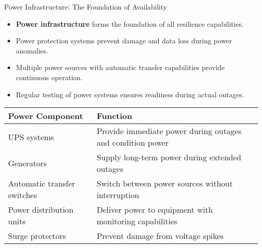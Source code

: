 \documentclass{beamer}
\begin{document}
\begin{frame}{Power Infrastructure: The Foundation of Availability}
    \begin{itemize}
        \item \textbf{Power infrastructure} forms the foundation of all resilience capabilities.
        \item Power protection systems prevent damage and data loss during power anomalies.
        \item Multiple power sources with automatic transfer capabilities provide continuous operation.
        \item Regular testing of power systems ensures readiness during actual outages.
    \end{itemize}
    
    \begin{table}
        \scriptsize
        \centering
        \begin{tabular}{p{3cm}p{7cm}}
            \toprule
            \textbf{Power Component} & \textbf{Function} \\
            \midrule
            UPS systems & Provide immediate power during outages and condition power \\
            Generators & Supply long-term power during extended outages \\
            Automatic transfer switches & Switch between power sources without interruption \\
            Power distribution units & Deliver power to equipment with monitoring capabilities \\
            Surge protectors & Prevent damage from voltage spikes \\
            \bottomrule
        \end{tabular}
    \end{table}
\end{frame}
\end{document}
